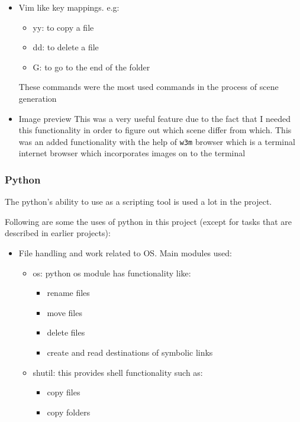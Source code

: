 \begin{itemize}
\item Vim like key mappings. e.g:
\begin{itemize}
\item yy: to copy a file
\item dd: to delete a file
\item G: to go to the end of the folder
\end{itemize}
\subitem These commands were the most used commands in the process of scene generation
\item Image preview
\subitem This was a very useful feature due to the fact that I needed this functionality in order to figure out which scene differ from which. This was an added functionality with the help of \texttt{w3m} browser which is a terminal internet browser which incorporates images on to the terminal
\end{itemize}

\subsubsection{Python}
The python's ability to use as a scripting tool is used a lot in the project.

Following are some the uses of python in this project (except for tasks that are described in earlier projects):

\begin{itemize}
\item File handling and work related to OS. Main modules used:
\begin{itemize}
\item os: python os module has functionality like:
	\begin{itemize}
	\item rename files
	\item move files
	\item delete files
	\item create and read destinations of symbolic links 
	\end{itemize}
\item shutil: this provides shell functionality such as:
	\begin{itemize}
	\item copy files
	\item copy folders
	\end{itemize}
\end{itemize}
\end{itemize}

